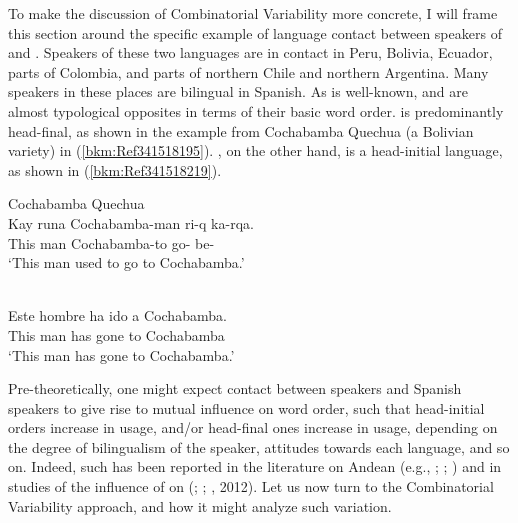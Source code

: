 \documentclass[output=paper]{langsci/langscibook}
\begin{document}
To make the discussion of Combinatorial Variability more concrete, I will frame
this section around the specific example of language contact between speakers
of  and .  Speakers of these two languages are in contact in
Peru, Bolivia, Ecuador, parts of Colombia, and parts of northern Chile and
northern Argentina. Many  speakers in these places are bilingual in
Spanish.  As is well-known,  and  are almost typological
opposites in terms of their basic word order.  is predominantly
head-final, as shown in the example from Cochabamba Quechua (a Bolivian
variety) in (\ref{bkm:Ref341518195}).  , on the other hand, is a
head-initial language, as shown in (\ref{bkm:Ref341518219}).\largerpage

\ea\label{bkm:Ref341518195}Cochabamba Quechua\\
    \gll Kay  runa  Cochabamba-man  ri-q ka-rqa.\\
            This man Cochabamba-to go-\Nmlz{} be-\Pst{}\\
    \glt    \enquote*{This man used to go to Cochabamba.}
\z

\ea\label{bkm:Ref341518219}\\
    \gll Este hombre ha ido a Cochabamba.\\
            This  man      has   gone    to  Cochabamba\\
    \glt    \enquote*{This man has gone to Cochabamba.}
\z

Pre-theoretically, one might expect contact between  speakers and
Spanish speakers to give rise to mutual influence on word order, such that
head-initial orders increase in  usage, and/or head-final ones increase
in  usage, depending on the degree of bilingualism of the speaker,
attitudes towards each language, and so on.  Indeed, such has been reported in
the literature on Andean  (e.g., \citealt{Muntendam2008};
\citealt{Muysken1984}; \citealt{Sanchez2003}) and in studies of the influence
of  on  (\citealt{Camacho1999}; \citealt{Hintz2009};
\citealt{Sanchez2003}, 2012).  Let us now turn to the Combinatorial Variability
approach, and how it might analyze such variation.
\end{document}
